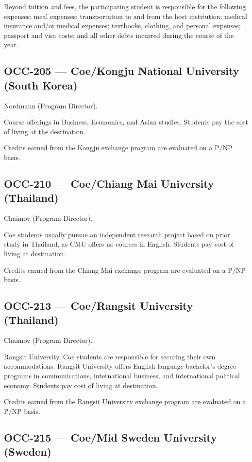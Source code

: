 \documentclass[
  letterpaper,
]{scrbook}
\begin{document}
Beyond tuition and fees, the participating student is responsible for
the following expenses: meal expenses; transportation to and from the
host institution; medical insurance and/or medical expenses; textbooks,
clothing, and personal expenses; passport and visa costs; and all other
debts incurred during the course of the year.

\subsection{OCC-205 --- Coe/Kongju National University (South
Korea)}\label{occ-205-coekongju-national-university-south-korea}

Nordmann (Program Director).

Course offerings in Business, Economics, and Asian studies. Students pay
the cost of living at the destination.

Credits earned from the Kongju exchange program are evaluated on a P/NP
basis.

\subsection{OCC-210 --- Coe/Chiang Mai University
(Thailand)}\label{occ-210-coechiang-mai-university-thailand}

Chaimov (Program Director).

Coe students usually pursue an independent research project based on
prior study in Thailand, as CMU offers no courses in English. Students
pay cost of living at destination.

Credits earned from the Chiang Mai exchange program are evaluated on a
P/NP basis.

\subsection{OCC-213 --- Coe/Rangsit University
(Thailand)}\label{occ-213-coerangsit-university-thailand}

Chaimov (Program Director).

Rangsit University. Coe students are responsible for securing their own
accommodations. Rangsit University offers English language bachelor's
degree programs in communications, international business, and
international political economy. Students pay cost of living at
destination.

Credits earned from the Rangsit University exchange program are
evaluated on a P/NP basis.

\subsection{OCC-215 --- Coe/Mid Sweden University
(Sweden)}\label{occ-215-coemid-sweden-university-sweden}
\end{document}
